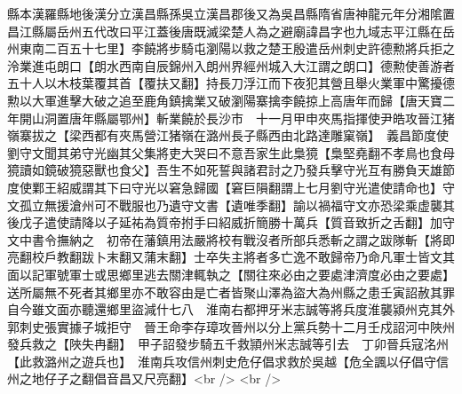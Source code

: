 縣本漢羅縣地後漢分立漢昌縣孫吳立漢昌郡後又為吳昌縣隋省唐神龍元年分湘隂置昌江縣屬岳州五代改曰平江蓋後唐既滅梁楚人為之避廟諱昌字也九域志平江縣在岳州東南二百五十七里】李饒將步騎屯瀏陽以救之楚王殷遣岳州刺史許德勲將兵拒之泠業進屯朗口【朗水西南自辰錦州入朗州界經州城入大江謂之朗口】德勲使善游者五十人以木枝葉覆其首【覆扶又翻】持長刀浮江而下夜犯其營且舉火業軍中驚擾德勲以大軍進擊大破之追至鹿角鎮擒業又破瀏陽寨擒李饒掠上高唐年而歸【唐天寶二年開山洞置唐年縣屬鄂州】斬業饒於長沙市　十一月甲申夾馬指揮使尹皓攻晉江猪嶺寨拔之【梁西都有夾馬營江猪嶺在潞州長子縣西由北路達雕窠嶺】　義昌節度使劉守文聞其弟守光幽其父集將吏大哭曰不意吾家生此梟獍【梟堅堯翻不孝鳥也食母獍讀如鏡破獍惡獸也食父】吾生不如死誓與諸君討之乃發兵擊守光互有勝負天雄節度使鄴王紹威謂其下曰守光以窘急歸國【窘巨隕翻謂上七月劉守光遣使請命也】守文孤立無援滄州可不戰服也乃遺守文書【遺唯季翻】諭以禍福守文亦恐梁乘虚襲其後戊子遣使請降以子延祐為質帝拊手曰紹威折簡勝十萬兵【質音致折之舌翻】加守文中書令撫納之　初帝在藩鎮用法嚴將校有戰沒者所部兵悉斬之謂之跋隊斬【將即亮翻校戶教翻跋卜末翻又蒲末翻】士卒失主將者多亡逸不敢歸帝乃命凡軍士皆文其面以記軍號軍士或思鄉里逃去關津輒執之【關往來必由之要處津濟度必由之要處】送所屬無不死者其鄉里亦不敢容由是亡者皆聚山澤為盜大為州縣之患壬寅詔赦其罪自今雖文面亦聽還鄉里盜減什七八　淮南右都押牙米志誠等將兵度淮襲潁州克其外郭刺史張實據子城拒守　晉王命李存璋攻晉州以分上黨兵勢十二月壬戍詔河中陜州發兵救之【陜失冉翻】　甲子詔發步騎五千救頴州米志誠等引去　丁卯晉兵寇洺州【此救潞州之遊兵也】　淮南兵攻信州刺史危仔倡求救於吳越【危全諷以仔倡守信州之地仔子之翻倡音昌又尺亮翻】<br />
<br />
